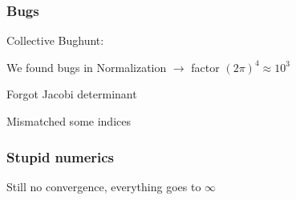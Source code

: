 \begin{frame}\frametitle{Bugs}
  {\Large Collective Bughunt:}


  {\small
    \vspace{3mm}
    We found bugs in Normalization $\rightarrow$ factor $(2\pi)^4 \approx 10^3$

    \pause
    \vspace{3mm}
    Forgot Jacobi determinant

    \pause
    \vspace{3mm}
    Mismatched some indices
  }
\end{frame}

\begin{frame}\frametitle{Stupid numerics}
  Still no convergence, everything goes to $\infty$
\end{frame}
\endinput